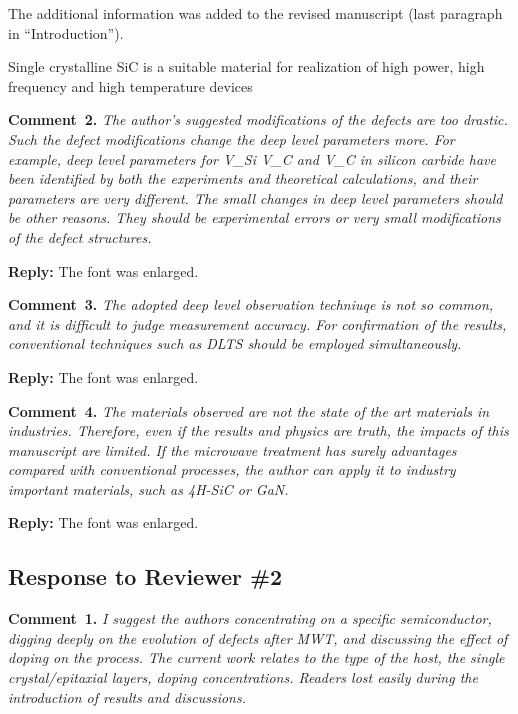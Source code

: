\documentclass[10pt]{iopart}
\begin{document}
The additional information was added to the revised manuscript
(last paragraph in ``Introduction'').

Single crystalline SiC is a suitable material for realization of high power, high frequency and high
temperature devices

\vspace{1cm}
\noindent
\textcolor[rgb]{0.00,0.50,1.00}{\textbf{Comment~2.}}
\emph{The author's suggested modifications of the defects are too drastic.
Such the defect modifications change the deep level parameters more.
For example, deep level parameters for V\_Si V\_C and V\_C in silicon carbide have been
identified by both the experiments and theoretical calculations,
and their parameters are very different.
The small changes in deep level parameters should be other reasons.
They should be experimental errors or very small modifications of the defect structures.}

\noindent
\textcolor[rgb]{0.51,0.00,0.00}{\textbf{Reply:}}
The font was enlarged.

\vspace{1cm}
\noindent
\textcolor[rgb]{0.00,0.50,1.00}{\textbf{Comment~3.}}
\emph{The adopted deep level observation techniuqe is not so common,
and it is difficult to judge measurement accuracy.
For confirmation of the results, conventional techniques such as DLTS should be employed simultaneously.}

\noindent
\textcolor[rgb]{0.51,0.00,0.00}{\textbf{Reply:}}
The font was enlarged.


\vspace{1cm}
\noindent
\textcolor[rgb]{0.00,0.50,1.00}{\textbf{Comment~4.}}
\emph{The materials observed are not the state of the art materials in industries.
Therefore, even if the results and physics are truth,
the impacts of this manuscript are limited.
If the microwave treatment has surely advantages compared
with conventional processes, the author can apply it to industry important materials, such as 4H-SiC or GaN.}


\noindent
\textcolor[rgb]{0.51,0.00,0.00}{\textbf{Reply:}}
The font was enlarged.


\subsection*{Response to Reviewer \#2 }
\noindent
\textcolor[rgb]{0.00,0.50,1.00}{\textbf{Comment~1.}}
\emph{I suggest the authors concentrating on a specific semiconductor,
digging deeply on the evolution of defects after MWT,
and discussing the effect of doping on the process.
The current work relates to the type of the host,
the single crystal/epitaxial layers, doping concentrations.
Readers lost easily during the introduction of results and discussions.}
\end{document}
